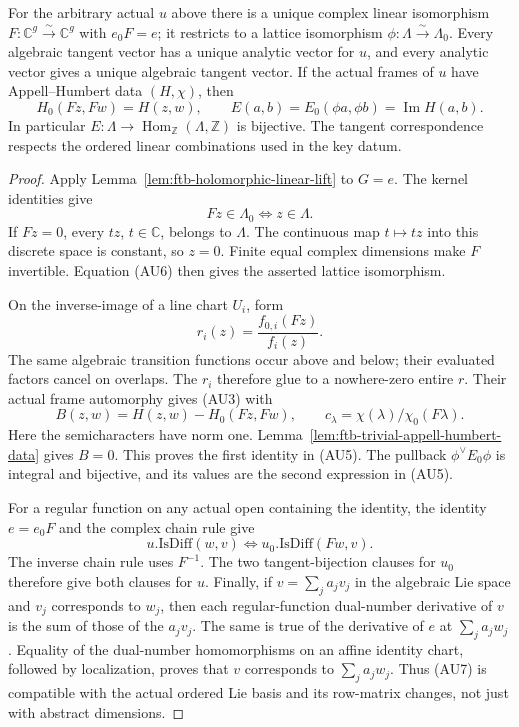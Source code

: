\begin{srproposition}
\label{prop:ftb-any-uniformization-tangent-perfect}
For the arbitrary actual \(u\) above there is a unique complex
linear isomorphism \(F:\mathbb C^g\overset{\sim}\longrightarrow\mathbb C^g\)
with \(e_0F=e\); it restricts to a lattice isomorphism
\(\phi:\Lambda\overset{\sim}\longrightarrow\Lambda_0\).
Every algebraic tangent vector has a unique analytic vector
for \(u\), and every analytic vector gives a unique algebraic
tangent vector.
If the actual frames of \(u\) have Appell--Humbert data
\((H,\chi)\), then
\[
       H_0(Fz,Fw)=H(z,w),\qquad
       E(a,b)=E_0(\phi a,\phi b)=\operatorname{Im}H(a,b).       \tag{AU5}
\]
In particular \(E:\Lambda\to\operatorname{Hom}_{\mathbb Z}(\Lambda,\mathbb Z)\)
is bijective.
The tangent correspondence respects the ordered linear
combinations used in the key datum.
\end{srproposition}
\begin{proof}
Apply Lemma~\ref{lem:ftb-holomorphic-linear-lift} to \(G=e\).
The kernel identities give
\[
                         Fz\in\Lambda_0\iff z\in\Lambda.       \tag{AU6}
\]
If \(Fz=0\), every \(tz\), \(t\in\mathbb C\), belongs to
\(\Lambda\).
The continuous map \(t\mapsto tz\) into this discrete space
is constant, so \(z=0\).
Finite equal complex dimensions make \(F\) invertible.
Equation (AU6) then gives the asserted lattice isomorphism.

On the inverse-image of a line chart \(U_i\), form
\[
                             r_i(z)=\frac{f_{0,i}(Fz)}{f_i(z)}.
\]
The same algebraic transition functions occur above and below;
their evaluated factors cancel on overlaps.
The \(r_i\) therefore glue to a nowhere-zero entire \(r\).
Their actual frame automorphy gives (AU3) with
\[
 B(z,w)=H(z,w)-H_0(Fz,Fw),\qquad
 c_\lambda=\chi(\lambda)/\chi_0(F\lambda).
\]
Here the semicharacters have norm one.
Lemma~\ref{lem:ftb-trivial-appell-humbert-data} gives \(B=0\).
This proves the first identity in (AU5).
The pullback \(\phi^\vee E_0\phi\) is integral and bijective,
and its values are the second expression in (AU5).

For a regular function on any actual open containing the
identity, the identity \(e=e_0F\) and the complex chain rule give
\[
                   u.\mathrm{IsDiff}(w,v)
                      \iff u_0.\mathrm{IsDiff}(Fw,v).          \tag{AU7}
\]
The inverse chain rule uses \(F^{-1}\).
The two tangent-bijection clauses for \(u_0\) therefore
give both clauses for \(u\).
Finally, if \(v=\sum_j a_jv_j\) in the algebraic Lie space and
\(v_j\) corresponds to \(w_j\), then each regular-function
dual-number derivative of \(v\) is the sum of those of the
\(a_jv_j\).
The same is true of the derivative of \(e\) at
\(\sum_j a_jw_j\).
Equality of the dual-number homomorphisms on an affine
identity chart, followed by localization, proves that
\(v\) corresponds to \(\sum_j a_jw_j\).
Thus (AU7) is compatible with the actual ordered Lie basis
and its row-matrix changes, not just with abstract dimensions.
\end{proof}

